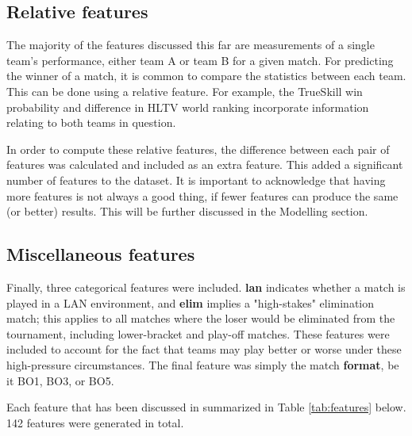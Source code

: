 \subsection{Relative features}

The majority of the features discussed this far are measurements of a single team's performance, either team A or team B for a given match. For predicting the winner of a match, it is common to compare the statistics between each team. This can be done using a relative feature. For example, the TrueSkill win probability and difference in HLTV world ranking incorporate information relating to both teams in question.

In order to compute these relative features, the difference between each pair of features was calculated and included as an extra feature. This added a significant number of features to the dataset. It is important to acknowledge that having more features is not always a good thing, if fewer features can produce the same (or better) results. This will be further discussed in the Modelling section.

\subsection{Miscellaneous features}

Finally, three categorical features were included. \textbf{lan} indicates whether a match is played in a LAN environment, and \textbf{elim} implies a "high-stakes" elimination match; this applies to all matches where the loser would be eliminated from the tournament, including lower-bracket and play-off matches. These features were included to account for the fact that teams may play better or worse under these high-pressure circumstances. The final feature was simply the match \textbf{format}, be it BO1, BO3, or BO5.

Each feature that has been discussed in summarized in Table \ref{tab:features} below. 142 features were generated in total.

